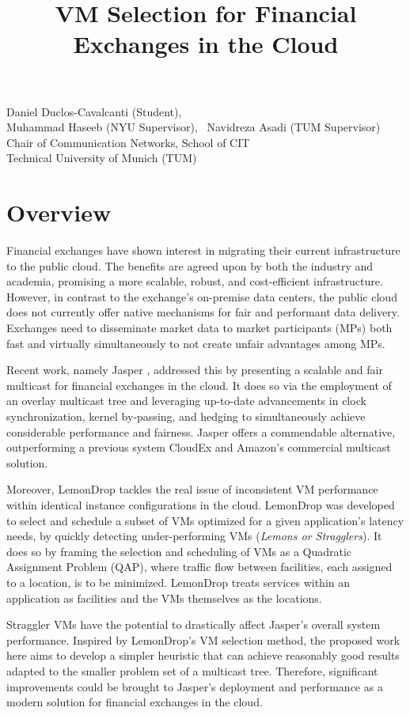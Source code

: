 \documentclass{article}
\title{VM Selection for Financial Exchanges in the Cloud}
\makeatletter
\renewcommand{\maketitle}{%
    \thispagestyle{fancy}%
    \begin{center}
        \Large\bfseries\@title
    \end{center}
    \vspace{-0.25cm}
    \begin{center}
        Daniel Duclos-Cavalcanti (Student),
        \\
        Muhammad Haseeb (NYU Supervisor),
        ~Navidreza Asadi (TUM Supervisor) 
        \\Chair of Communication Networks, School of CIT
        \\Technical University of Munich (TUM)
    \end{center}
}
\makeatother
\begin{document}
\maketitle

\section{Overview}

Financial exchanges have shown interest in migrating their current infrastructure 
to the public cloud. The benefits are agreed upon by both the industry and 
academia, promising a more scalable, robust, and cost-efficient infrastructure. 
However, in contrast to the exchange's on-premise data centers, the public cloud does not 
currently offer native mechanisms for fair and performant data delivery. 
Exchanges need to disseminate market data to market participants (MPs) both fast and 
virtually simultaneously to not create unfair advantages among MPs.

Recent work, namely Jasper \cite{haseeb2024jasper}, addressed this by presenting a scalable and fair multicast 
for financial exchanges in the cloud. It does so via the employment of an overlay multicast tree and leveraging 
up-to-date advancements in clock synchronization, kernel by-passing, and hedging to simultaneously 
achieve considerable performance and fairness. Jasper offers a commendable alternative, 
outperforming a previous system CloudEx and Amazon's commercial multicast solution.

Moreover, LemonDrop \cite{sachidananda2022scheduling} tackles the real issue of 
inconsistent VM performance within identical instance configurations in the cloud. 
LemonDrop was developed to select and schedule a subset of VMs optimized for a given application's latency needs, by quickly 
detecting under-performing VMs (\textit{Lemons or Stragglers}).
It does so by framing the selection and scheduling of VMs as a Quadratic Assignment Problem (QAP), where 
traffic flow between facilities, each assigned to a location, is to be minimized. 
LemonDrop treats services within an application as facilities and the VMs themselves as the locations. 

Straggler VMs have the potential to drastically affect Jasper's overall system performance.
Inspired by LemonDrop's VM selection method, the proposed work here aims to develop a simpler heuristic that 
can achieve reasonably good results adapted to the smaller problem set of a multicast tree. 
Therefore, significant improvements could be brought to Jasper's deployment and performance as a 
modern solution for financial exchanges in the cloud.
\end{document}
